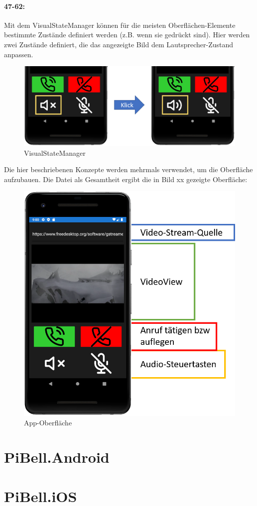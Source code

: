 \paragraph{47-62:} Mit dem VisualStateManager können für die meisten Oberflächen-Elemente bestimmte Zustände definiert werden (z.B. wenn sie gedrückt sind). Hier werden zwei Zustände definiert, die das angezeigte Bild dem Lautsprecher-Zustand anpassen.
\begin{figure}[H]
    \centering\includegraphics[width=.9\linewidth]{images/xamarin/VisualStateManager.png}
    \caption{VisualStateManager}
\end{figure}
Die hier beschriebenen Konzepte werden mehrmals verwendet, um die Oberfläche aufzubauen. Die Datei als Gesamtheit ergibt die in Bild xx gezeigte Oberfläche:
\begin{figure}[H]
    \centering\includegraphics[width=.9\linewidth]{images/xamarin/MainPage.png}
    \caption{App-Oberfläche}
\end{figure}

\section{PiBell.Android}
\section{PiBell.iOS}